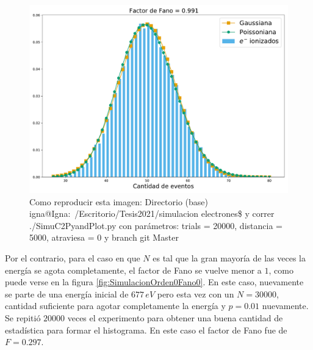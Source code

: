 \begin{figure}%
    \centering
    \includegraphics[scale=0.35]{Figs/Orden0_fano1.pdf}
    \caption{\footnotesize{Como reproducir esta imagen: Directorio (base) igna@Igna:~/Escritorio/Tesis2021/simulacion electrones\$ y correr ./SimuC2PyandPlot.py con parámetros: trials = 20000, distancia = 5000, atraviesa = 0 y branch git Master}}
    \label{fig:SimulacionOrden0Fano1}
\end{figure}
\indent Por el contrario, para el caso en que $N$ es tal que la gran mayoría de las veces la energía se agota completamente, el factor de Fano se vuelve menor a $1$, como puede verse en la figura \ref{fig:SimulacionOrden0Fano0}. En este caso, nuevamente se parte de una energía inicial de $677\,\si{eV}$ pero esta vez con un $N = 30000$, cantidad suficiente para agotar completamente la energía y $p=0.01$ nuevamente. Se repitió $20000$ veces el experimento para obtener una buena cantidad de estadística para formar el histograma. En este caso el factor de Fano fue de $F = 0.297$.\\
